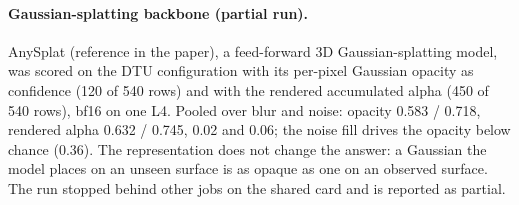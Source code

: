 \paragraph{Gaussian-splatting backbone (partial run).}
AnySplat (reference in the paper), a feed-forward 3D Gaussian-splatting model, was scored on the DTU configuration with its per-pixel Gaussian opacity as confidence (120 of 540 rows) and with the rendered accumulated alpha (450 of 540 rows), bf16 on one L4. Pooled over blur and noise: opacity \auroc{} 0.583 / \cur{} 0.718, rendered alpha 0.632 / 0.745, \curerr{} 0.02 and 0.06; the noise fill drives the opacity below chance (0.36). The representation does not change the answer: a Gaussian the model places on an unseen surface is as opaque as one on an observed surface. The run stopped behind other jobs on the shared card and is reported as partial.
